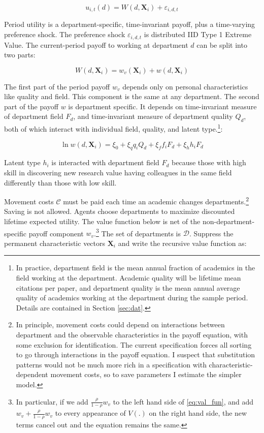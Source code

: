 \documentclass[]{article}
\begin{document}
\begin{equation}
    u_{i,t}(d) = W(d, \mathbf{X}_i) + \varepsilon_{i,d,t}
    \label{eq:util}
\end{equation}

Period utility is a department-specific, time-invariant payoff, plus a time-varying preference shock.  The preference shock
 $\varepsilon_{i,d,t}$ is distributed IID Type 1 Extreme Value.
The current-period payoff to working at department $d$ can be split into two parts:

\begin{equation}
    W(d, \mathbf{X}_i) = w_v(\mathbf{X}_i) + w(d, \mathbf{X}_i)
\end{equation}

The first part of the period payoff $w_v$ depends only
on personal characteristics like quality and field. This component is the 
same at any department.  The second part of the payoff
$w$ is department specific. It depends on time-invariant measure of department
field $F_d$, and time-invariant measure of department quality $Q_d$, both of which interact with
individual field, quality, and latent type.\footnote{In practice, department 
field is the mean annual fraction of academics in the field working at the department.  Academic 
quality will be lifetime mean citations per paper, and department quality is the mean 
annual average quality of academics working at the department
during the sample period.  Details are contained in Section \ref{sec:dat}.}:

\begin{equation}
    \ln w(d, \mathbf{X}_i) = \xi_0  + \xi_q q_i Q_d + \xi_f f_i F_d + \xi_h h_i F_d
    \label{eq:horz_wage}
\end{equation} 

Latent type $h_i$ is interacted with department field $F_d$ because those with high
skill in discovering new research value having colleagues
in the same field differently than those with low skill.

Movement costs $\mathcal{C}$ must be paid each time an academic changes departments.\footnote{In principle, movement costs could depend on interactions between department and the observable characteristics in the payoff equation, with some exclusion for identification.  The current specification forces all sorting to go through interactions in the payoff equation.  I suspect that substitution patterns would not be much more rich in a specification with characteristic-dependent movement costs, so to save parameters I estimate the simpler model.} Saving is not allowed. Agents choose departments to maximize discounted lifetime expected utility.
The value function below is net of the non-department-specific payoff component $w_v$.\footnote{In particular, if we add $\frac{\rho}{1 - \rho} w_v$ to the left hand side of \eqref{eq:val_fun}, and add $w_v + \frac{\rho}{1 - \rho} w_v$ to every appearance of $V(.)$ on the right hand side, the new terms cancel out and the equation remains the same.}
The set of departments is $\mathcal{D}$.
Suppress the permanent characteristic vectors $\mathbf{X}_i$ and write the
recursive value function as:
\end{document}
